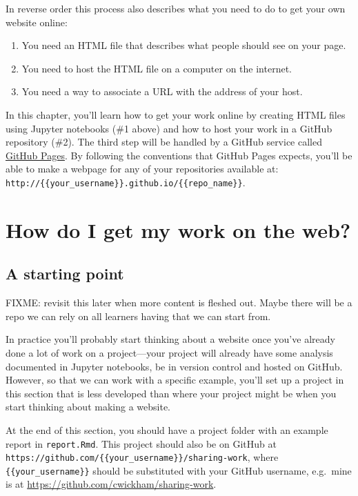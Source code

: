 \documentclass[]{Nemilov}
\providecommand{\tightlist}{%
  \setlength{\itemsep}{0pt}\setlength{\parskip}{0pt}}
\begin{document}
In reverse order this process also describes what you need to do to get your own website online:

\begin{enumerate}
\def\labelenumi{\arabic{enumi}.}
\tightlist
\item
  You need an HTML file that describes what people should see on your page.
\item
  You need to host the HTML file on a computer on the internet.
\item
  You need a way to associate a URL with the address of your host.
\end{enumerate}

In this chapter,
you'll learn how to get your work online
by creating HTML files using Jupyter notebooks (\#1 above)
and how to host your work in a GitHub repository (\#2).
The third step will be handled by a GitHub service called \href{https://pages.github.com/}{GitHub Pages}.
By following the conventions that GitHub Pages expects,
you'll be able to make a webpage for any of your repositories available at:
\texttt{http://\{\{your\_username\}\}.github.io/\{\{repo\_name\}\}}.

\hypertarget{how-do-i-get-my-work-on-the-web}{%
\section{How do I get my work on the web?}\label{how-do-i-get-my-work-on-the-web}}

\hypertarget{a-starting-point}{%
\subsection{A starting point}\label{a-starting-point}}

FIXME: revisit this later when more content is fleshed out.
Maybe there will be a repo we can rely on all learners having that we can start from.

In practice you'll probably start thinking about a website once you've already done a lot of work
on a project---your project will already have some analysis documented in Jupyter notebooks,
be in version control and hosted on GitHub.
However,
so that we can work with a specific example,
you'll set up a project in this section that is less developed
than where your project might be when you start thinking about making a website.

At the end of this section,
you should have a project folder with an example report in \texttt{report.Rmd}.
This project should also be on GitHub at \texttt{https://github.com/\{\{your\_username\}\}/sharing-work},
where \texttt{\{\{your\_username\}\}} should be substituted with your GitHub username,
e.g.~mine is at \url{https://github.com/cwickham/sharing-work}.
\end{document}
